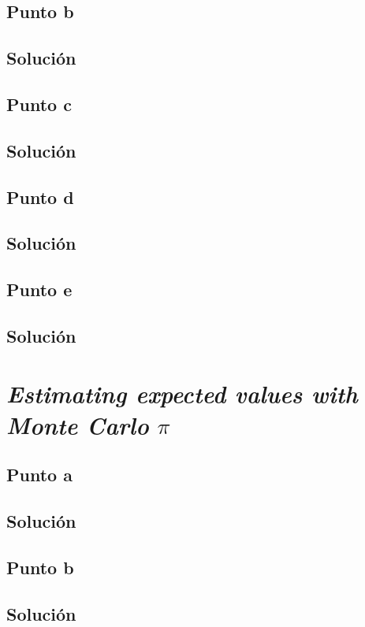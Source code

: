 \documentclass[12pt]{article}
\begin{document}
\subsection{Punto b}
\subsection{Solución}

\subsection{Punto c}
\subsection{Solución}

\subsection{Punto d}
\subsection{Solución}

\subsection{Punto e}
\subsection{Solución}



\section{\textit{Estimating expected values with Monte Carlo} \(\pi\)}

\subsection{Punto a}
\subsection{Solución}

\subsection{Punto b}
\subsection{Solución}
\end{document}
